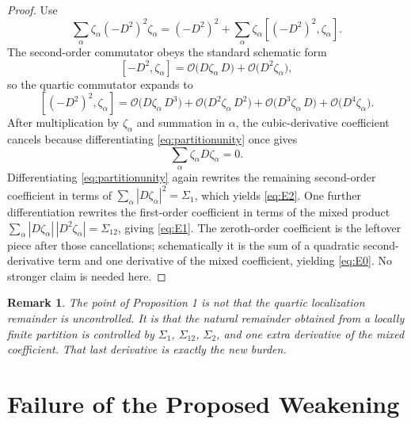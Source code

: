 \documentclass[11pt]{article}
\newtheorem{remark}{Remark}
\begin{document}
\begin{proof}
Use
\[
\sum_\alpha \zeta_\alpha (-D^2)^2 \zeta_\alpha
=
(-D^2)^2 + \sum_\alpha \zeta_\alpha [(-D^2)^2,\zeta_\alpha].
\]
The second-order commutator obeys the standard schematic form
\[
[-D^2,\zeta_\alpha]
=
\mathcal O\!\bigl(D\zeta_\alpha\,D\bigr)
+ \mathcal O\!\bigl(D^2\zeta_\alpha\bigr),
\]
so the quartic commutator expands to
\[
[(-D^2)^2,\zeta_\alpha]
=
\mathcal O\!\bigl(D\zeta_\alpha\,D^3\bigr)
+ \mathcal O\!\bigl(D^2\zeta_\alpha\,D^2\bigr)
+ \mathcal O\!\bigl(D^3\zeta_\alpha\,D\bigr)
+ \mathcal O\!\bigl(D^4\zeta_\alpha\bigr).
\]
After multiplication by \(\zeta_\alpha\) and summation in \(\alpha\), the cubic-derivative coefficient cancels because differentiating \eqref{eq:partitionunity} once gives
\[
\sum_\alpha \zeta_\alpha D\zeta_\alpha = 0.
\]
Differentiating \eqref{eq:partitionunity} again rewrites the remaining second-order coefficient in terms of \(\sum_\alpha |D\zeta_\alpha|^2=\Sigma_1\), which yields \eqref{eq:E2}. One further differentiation rewrites the first-order coefficient in terms of the mixed product \(\sum_\alpha |D\zeta_\alpha|\,|D^2\zeta_\alpha|=\Sigma_{12}\), giving \eqref{eq:E1}. The zeroth-order coefficient is the leftover piece after those cancellations; schematically it is the sum of a quadratic second-derivative term and one derivative of the mixed coefficient, yielding \eqref{eq:E0}. No stronger claim is needed here.
\end{proof}

\begin{remark}
The point of Proposition 1 is not that the quartic localization remainder is uncontrolled. It is that the natural remainder obtained from a locally finite partition is controlled by \(\Sigma_1\), \(\Sigma_{12}\), \(\Sigma_2\), and one extra derivative of the mixed coefficient. That last derivative is exactly the new burden.
\end{remark}

\section{Failure of the Proposed Weakening}
\end{document}
